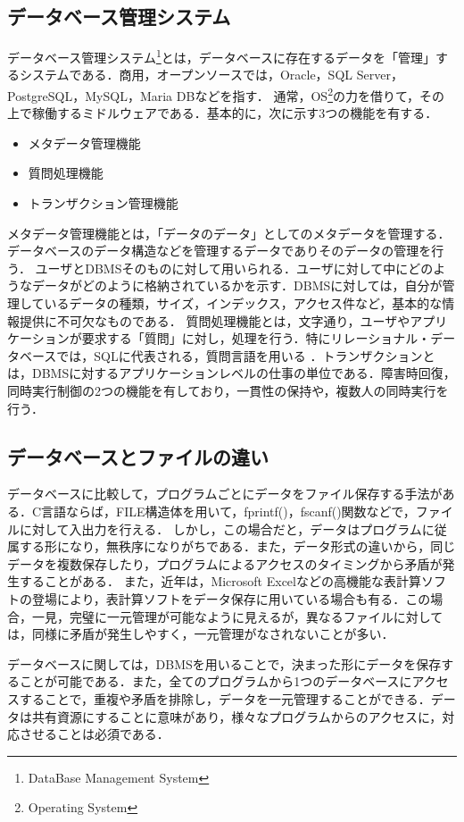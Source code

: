 \documentclass[a4paper,10pt]{jreport}
\begin{document}
\subsection{データベース管理システム}
データベース管理システム\footnote{DataBase Management System}とは，データベースに存在するデータを「管理」するシステムである．商用，オープンソースでは，Oracle，SQL Server，PostgreSQL，MySQL，Maria DBなどを指す．
通常，OS\footnote{Operating System}の力を借りて，その上で稼働するミドルウェアである．基本的に，次に示す3つの機能を有する．
\begin{itemize}
	\item メタデータ管理機能
	\item 質問処理機能
	\item トランザクション管理機能
\end{itemize}
\par メタデータ管理機能とは，「データのデータ」としてのメタデータを管理する．データベースのデータ構造などを管理するデータでありそのデータの管理を行う．
ユーザとDBMSそのものに対して用いられる．ユーザに対して中にどのようなデータがどのように格納されているかを示す．DBMSに対しては，自分が管理しているデータの種類，サイズ，インデックス，アクセス件など，基本的な情報提供に不可欠なものである．
質問処理機能とは，文字通り，ユーザやアプリケーションが要求する「質問」に対し，処理を行う．特にリレーショナル・データベースでは，SQLに代表される，質問言語を用いる
．トランザクションとは，DBMSに対するアプリケーションレベルの仕事の単位である．障害時回復，同時実行制御の2つの機能を有しており，一貫性の保持や，複数人の同時実行を行う．

\subsection{データベースとファイルの違い}
データベースに比較して，プログラムごとにデータをファイル保存する手法がある．C言語ならば，FILE構造体を用いて，fprintf()，fscanf()関数などで，ファイルに対して入出力を行える．
しかし，この場合だと，データはプログラムに従属する形になり，無秩序になりがちである．また，データ形式の違いから，同じデータを複数保存したり，プログラムによるアクセスのタイミングから矛盾が発生することがある．
また，近年は，Microsoft Excelなどの高機能な表計算ソフトの登場により，表計算ソフトをデータ保存に用いている場合も有る．この場合，一見，完璧に一元管理が可能なように見えるが，異なるファイルに対しては，同様に矛盾が発生しやすく，一元管理がなされないことが多い．
\par データベースに関しては，DBMSを用いることで，決まった形にデータを保存することが可能である．また，全てのプログラムから1つのデータベースにアクセスすることで，重複や矛盾を排除し，データを一元管理することができる．データは共有資源にすることに意味があり，様々なプログラムからのアクセスに，対応させることは必須である．
\end{document}
